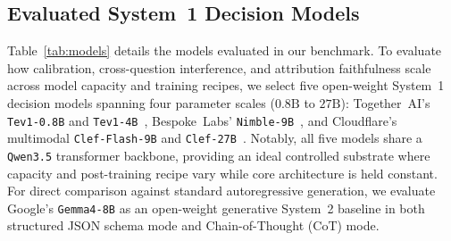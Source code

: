 \documentclass[10pt]{article}
\begin{document}
\subsection{Evaluated System~1 Decision Models}
Table~\ref{tab:models} details the models evaluated in our benchmark.
To evaluate how calibration, cross-question interference, and attribution faithfulness scale across model capacity and training recipes, we select five open-weight System~1 decision models spanning four parameter scales ($0.8\text{B}$ to $27\text{B}$): Together~AI's \texttt{Tev1-0.8B} and \texttt{Tev1-4B}~\cite{ollama2026tev1}, Bespoke~Labs' \texttt{Nimble-9B}~\cite{bespoke2026nimble}, and Cloudflare's multimodal \texttt{Clef-Flash-9B} and \texttt{Clef-27B}~\cite{cloudflare2026clef}.
Notably, all five models share a \texttt{Qwen3.5} transformer backbone, providing an ideal controlled substrate where capacity and post-training recipe vary while core architecture is held constant.
For direct comparison against standard autoregressive generation, we evaluate Google's \texttt{Gemma4-8B} as an open-weight generative System~2 baseline in both structured JSON schema mode and Chain-of-Thought (CoT) mode.

\begin{table}[t]
\centering
\caption{System~1 decision models and generative System~2 baseline evaluated in our benchmark, spanning $0.8$B to $27$B parameters.}
\label{tab:models}
\end{table}
\end{document}
